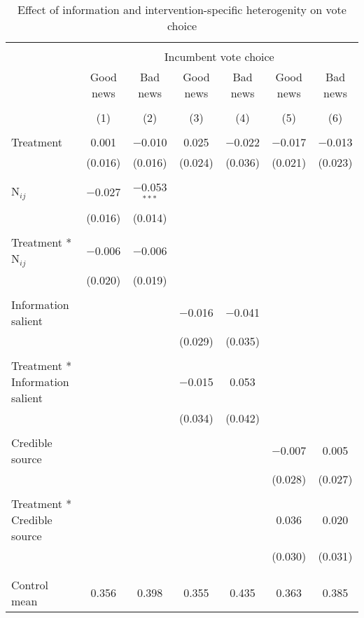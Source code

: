 \documentclass[]{article}
\begin{document}
\begin{table}[!htbp] \centering  \footnotesize
  \caption{Effect of information and intervention-specific heterogenity on vote choice} 
  \label{intervention_hetero} 
\begin{tabular}{@{\extracolsep{1pt}}lcccccc} 
\\[-1.8ex]\hline 
\hline \\[-1.8ex] 
 & \multicolumn{6}{c}{Incumbent vote choice} \\ 
\cline{2-7} 
 & Good news & Bad news & Good news & Bad news & Good news & Bad news \\ 
\cline{2-7}
\\[-1.8ex] & (1) & (2) & (3) & (4) & (5) & (6)\\ 
\hline \\[-1.8ex] 
 Treatment & 0.001 & $-$0.010 & 0.025 & $-$0.022 & $-$0.017 & $-$0.013 \\ 
  & (0.016) & (0.016) & (0.024) & (0.036) & (0.021) & (0.023) \\ 
  & & & & & & \\ 
 N$_{ij}$ & $-$0.027 & $-$0.053$^{***}$ &  &  &  &  \\ 
  & (0.016) & (0.014) &  &  &  &  \\ 
  & & & & & & \\ 
 Treatment * N$_{ij}$ & $-$0.006 & $-$0.006 &  &  &  &  \\ 
  & (0.020) & (0.019) &  &  &  &  \\ 
  & & & & & & \\ 
 Information salient &  &  & $-$0.016 & $-$0.041 &  &  \\ 
  &  &  & (0.029) & (0.035) &  &  \\ 
  & & & & & & \\ 
 Treatment * Information salient &  &  & $-$0.015 & 0.053 &  &  \\ 
  &  &  & (0.034) & (0.042) &  &  \\ 
  & & & & & & \\ 
 Credible source &  &  &  &  & $-$0.007 & 0.005 \\ 
  &  &  &  &  & (0.028) & (0.027) \\ 
  & & & & & & \\ 
 Treatment * Credible source &  &  &  &  & 0.036 & 0.020 \\ 
  &  &  &  &  & (0.030) & (0.031) \\ 
  & & & & & & \\ 
\hline \\[-1.8ex] 
Control mean & 0.356 & 0.398 & 0.355 & 0.435 & 0.363 & 0.385 \\ 

\end{tabular}
\end{table}
\end{document}
